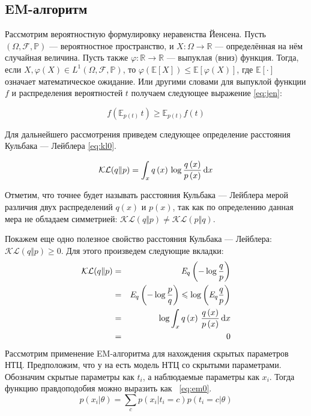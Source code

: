 \subsection{EM-алгоритм}
Рассмотрим вероятностную формулировку неравенства Йенсена. 
Пусть $(\Omega,\mathcal{F},\mathbb{P})$ — вероятностное пространство, и $X\colon\Omega \to \mathbb{R}$ — определённая на нём случайная величина. 
Пусть также $\varphi\colon\mathbb{R} \to \mathbb{R}$ — выпуклая (вниз) функция. 
Тогда, если $X, \varphi(X) \in L^1(\Omega,\mathcal{F},\mathbb{P})$, то  $\varphi(\mathbb{E}[X]) \leqslant \mathbb{E}[\varphi(X)]$, где $\mathbb{E}[\cdot]$ означает математическое ожидание. 
Или другими словами для выпуклой функции $f$ и распределения вероятностей $t$ получаем следующее выражение \ref{eq:jen}: 

\begin{equation} \label{eq:jen}
f (\mathbb{E}_{p \left( t \right)} \, t) \geqslant \mathbb{E}_{p \left( t \right)}f(t)
\end{equation}

Для дальнейшего рассмотрения приведем следующее определение расстояния Кульбака — Лейблера \ref{eq:kl0}. 

\begin{equation} \label{eq:kl0}
\mathcal{KL}(q \Vert  p) = \int_x q \left( x \right) \, \log \frac{q \left( x \right)}{p \left(  x \right)} \, {\rm d}x
\end{equation}

Отметим, что точнее будет называть расстояния Кульбака — Лейблера мерой различия двух распределений $q \left( x \right)$ и $p \left(  x \right)$, так как по определению данная мера не обладаем симметрией: $\mathcal{KL}(q \Vert p) \neq \mathcal{KL}(p \Vert q)$. 

Покажем еще одно полезное свойство расстояния Кульбака — Лейблера: $\mathcal{KL}(q \Vert p) \geqslant 0$.
Для этого произведем следующие вкладки:
\begin{eqnarray}\label{eq:kl03}
\mathcal{KL}(q \Vert   p) 
& = & \mathit{E}_q \left(  - \log	 \frac{q}{p} \right) \\
& = & \mathit{E}_q \left(  - \log	 \frac{p}{q} \right) \leqslant  \log \left( \mathit{E}_q \frac{q}{p} \right)\\
& = & \log \int_x q \left( x \right) \, \frac{q \left( x \right)}{p \left(  x \right)} \, {\rm d}x \\
& = & 0
\end{eqnarray}
Рассмотрим применение EM-алгоритма для нахождения скрытых параметров НТЦ.
Предположим, что у на есть модель НТЦ со скрытыми параметрами. 
Обозначим скрытые параметры как $t_i$, а наблюдаемые параметры как $x_i$. 
Тогда функцию правдоподобия можно выразить как ~\ref{eq:em0}.
\begin{equation} \label{eq:em0}
p \left( x_i \vert	\theta \right) = \sum_c p \left( x_i \vert t_i = c \right) p \left( t_i = c \vert \theta \right) 
\end{equation}

